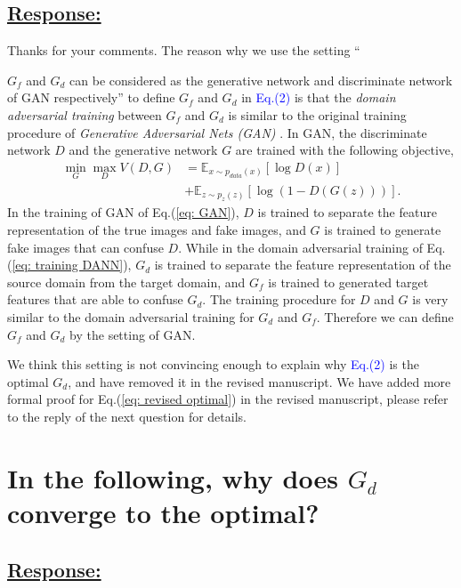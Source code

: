 \subsection*{\underline{\textbf{Response:}}}

Thanks for your comments.
The reason why we use the setting ``{$G_f$ and $G_d$ can be considered as the generative network and discriminate network of GAN respectively'' to define $G_f$ and $G_d$ in \textcolor{blue}{Eq.(2)} is that the \textit{domain adversarial training} between $G_f$ and $G_d$ is similar to the original training procedure of \textit{Generative Adversarial Nets (GAN)} \cite{goodfellow2014generative}.
In GAN, the discriminate network $D$ and the generative network $G$ are trained with the following objective, 
\begin{equation}
    \label{eq: GAN}
    \begin{split}
        \min_G \max_D V(D,G) &= \mathbb{E}_{x\sim p_{data}(x)}[\log D(x)] \\ &+ \mathbb{E}_{z\sim p_z(z)}[\log (1-D(G(z)))]. 
    \end{split}
\end{equation}
In the training of GAN of Eq.(\ref{eq: GAN}), $D$ is trained to separate the feature representation of the true images and fake images, and $G$ is trained to generate fake images that can confuse $D$.
While in the domain adversarial training of Eq.(\ref{eq: training DANN}), $G_d$ is trained to separate the feature representation of the source domain from the target domain, and $G_f$ is trained to generated target features that are able to confuse $G_d$.
The training procedure for $D$ and $G$ is very similar to the domain adversarial training for $G_d$ and $G_f$. 
Therefore we can define $G_f$ and $G_d$ by the setting of GAN.

We think this setting is not convincing enough to explain why \textcolor{blue}{Eq.(2)} is the optimal $G_d$, and have removed it in the revised manuscript.
We have added more formal proof for Eq.(\ref{eq: revised optimal}) in the revised manuscript, please refer to the reply of the next question for details.

\section{In the following, why does $G_d$ converge to the optimal?}
\subsection*{\underline{\textbf{Response:}}}

}
